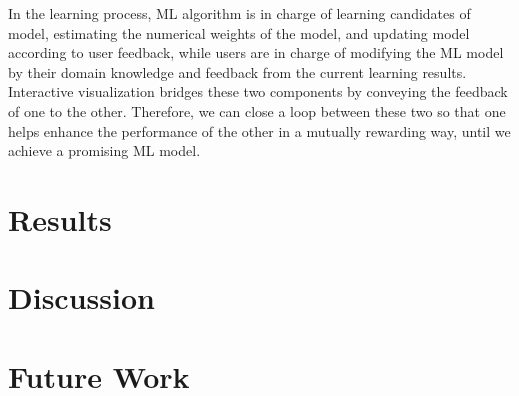 \documentclass{chi2009}
\begin{document}
In the learning process, ML algorithm is in charge of learning candidates of model, estimating the numerical weights of the model, and updating model according to user feedback, while users are in charge of modifying the ML model by their domain knowledge and feedback from the current learning results. Interactive visualization bridges these two components by conveying the feedback of one to the other. Therefore,  we can close a loop between these two so that one helps enhance the performance of the other in a mutually rewarding way, until we achieve a promising ML model.

\section{Results}


\section{Discussion}


\section{Future Work}



\end{document}

